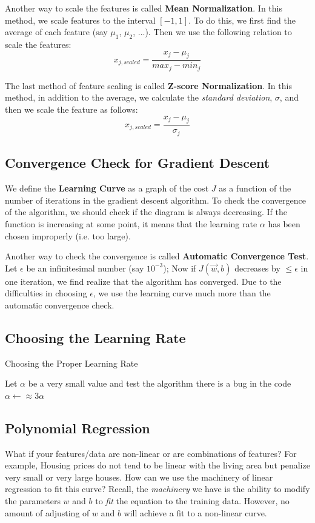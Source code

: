 \documentclass[a4paper, 12pt]{book}
\begin{document}
Another way to scale the features is called \textbf{Mean Normalization}. In this method, we scale features to the interval $\left[-1,1\right]$. To do this, we first find the average of each feature (say $\mu_1$, $\mu_2$, ...). Then we use the following relation to scale the features: \[x_{j, scaled} = \frac{x_j - \mu_j}{max_j - min_j}\]

The last method of feature scaling is called \textbf{Z-score Normalization}. In this method, in addition to the average, we calculate the \emph{standard deviation}, $\sigma$, and then we scale the feature as follows: \[x_{j, scaled} = \frac{x_j - \mu_j}{\sigma_j}\]

\subsection{Convergence Check for Gradient Descent}
We define the \textbf{Learning Curve} as a graph of the cost $J$ as a function of the number of iterations in the gradient descent algorithm. To check the convergence of the algorithm, we should check if the diagram is always decreasing. If the function is increasing at some point, it means that the learning rate $\alpha$ has been chosen improperly (i.e. too large).

Another way to check the convergence is called \textbf{Automatic Convergence Test}. Let $\epsilon$ be an infinitesimal number (say $10^{-3}$); Now if $J(\Vec{w},b)$ decreases by $\le \epsilon$ in one iteration, we find realize that the algorithm has converged. Due to the difficulties in choosing $\epsilon$, we use the learning curve much more than the automatic convergence check.

\subsection{Choosing the Learning Rate}
\begin{algorithm}
\caption{Choosing the Proper Learning Rate}
\begin{algorithmic} [1]
\State Let $\alpha$ be a very small value and test the algorithm
    \State there is a bug in the code
\Else
    \Repeat
    \State $\alpha \gets \approx 3\alpha$
\EndIf
\end{algorithmic}
\end{algorithm}

\subsection{Polynomial Regression}
What if your features/data are non-linear or are combinations of features? For example,  Housing prices do not tend to be linear with the living area but penalize very small or very large houses. How can we use the machinery of linear regression to fit this curve? Recall, the \emph{machinery} we have is the ability to modify the parameters $w$ and $b$ to \emph{fit} the equation to the training data. However, no amount of adjusting of $w$ and $b$ will achieve a fit to a non-linear curve.
\end{document}

